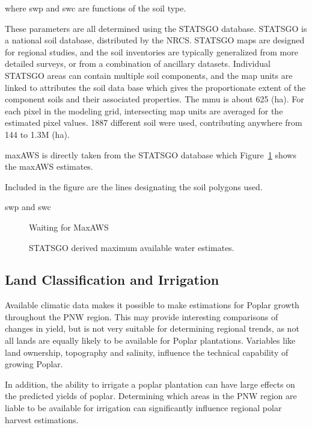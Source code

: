 \documentclass[preprint,12pt]{elsarticle}
\begin{document}
where \ac{swp} and \ac{swc} are functions of the soil type.

These parameters are all determined using the \ac{STATSGO} database.
\ac{STATSGO} is a national soil database, distributed by the
\ac{NRCS}.  \ac{STATSGO} maps are designed for regional studies, and
the soil inventories are typically generalized from more detailed
surveys, or from a combination of ancillary datasets.  Individual
\ac{STATSGO} areas can contain multiple soil components, and the map
units are linked to attributes the soil data base which gives the
proportionate extent of the component soils and their associated
properties.  The \ac{mmu} is about 625 (ha).  For each pixel in the
modeling grid, intersecting map units are averaged for the estimated
pixel values.  1887 different soil were used, contributing anywhere
from 144 to 1.3M (ha).

\ac{maxAWS} is directly taken from the \ac{STATSGO} database which
Figure~\ref{fig:aws} shows the \ac{maxAWS} estimates.

Included in the figure are the lines designating the soil polygons
used.  

\ac{swp} and \ac{swc} 

\begin{figure}
  \centering
  Waiting for MaxAWS
  \caption{\ac{STATSGO} derived maximum available water estimates. }
  \label{fig:aws}
\end{figure}


\subsection{Land Classification and Irrigation}
\label{sec:land}

Available climatic data makes it possible to make estimations for
Poplar growth throughout the \ac{PNW} region.  This may provide
interesting comparisons of changes in yield, but is not very suitable
for determining regional trends, as not all lands are equally likely
to be available for Poplar plantations.  Variables like land
ownership, topography and salinity, influence the technical capability
of growing Poplar.  

In addition, the ability to irrigate a poplar plantation can have
large effects on the predicted yields of poplar.  Determining which
areas in the \ac{PNW} region are liable to be available for irrigation
can significantly influence regional polar harvest estimations.  
\end{document}
